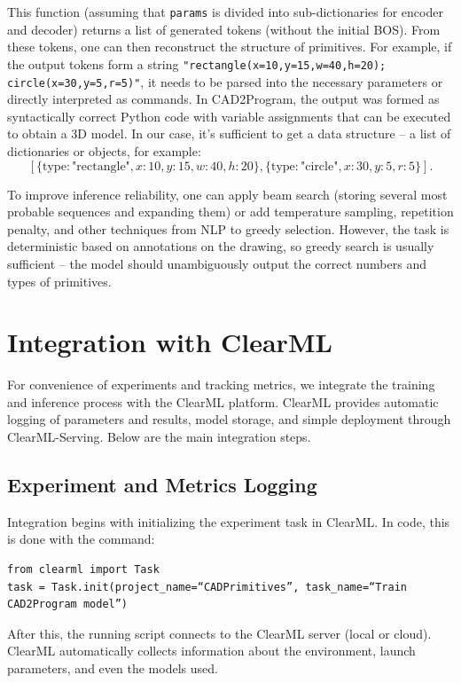\documentclass{article}
\begin{document}
This function (assuming that \texttt{params} is divided into sub-dictionaries for encoder and decoder) returns a list of generated tokens (without the initial BOS). From these tokens, one can then reconstruct the structure of primitives. For example, if the output tokens form a string \texttt{"rectangle(x=10,y=15,w=40,h=20); circle(x=30,y=5,r=5)"}, it needs to be parsed into the necessary parameters or directly interpreted as commands. In CAD2Program, the output was formed as syntactically correct Python code with variable assignments that can be executed to obtain a 3D model. In our case, it's sufficient to get a data structure – a list of dictionaries or objects, for example:
$$[ \{\text{type}: \text{"rectangle"}, x:10, y:15, w:40, h:20\}, \{\text{type}:\text{"circle"}, x:30, y:5, r:5\} ].$$

To improve inference reliability, one can apply beam search (storing several most probable sequences and expanding them) or add temperature sampling, repetition penalty, and other techniques from NLP to greedy selection. However, the task is deterministic based on annotations on the drawing, so greedy search is usually sufficient – the model should unambiguously output the correct numbers and types of primitives.

\section{Integration with ClearML}

For convenience of experiments and tracking metrics, we integrate the training and inference process with the ClearML platform. ClearML provides automatic logging of parameters and results, model storage, and simple deployment through ClearML-Serving. Below are the main integration steps.

\subsection{Experiment and Metrics Logging}

Integration begins with initializing the experiment task in ClearML. In code, this is done with the command:
\begin{lstlisting}
from clearml import Task
task = Task.init(project_name=“CADPrimitives”, task_name=“Train CAD2Program model”)
\end{lstlisting}
After this, the running script connects to the ClearML server (local or cloud). ClearML automatically collects information about the environment, launch parameters, and even the models used.
\end{document}
